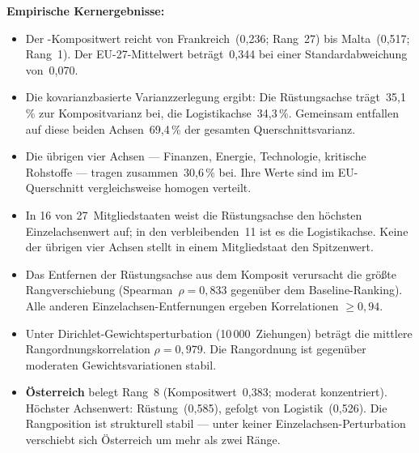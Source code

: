 \medskip
\textbf{Empirische Kernergebnisse:}
\begin{itemize}[leftmargin=2em]
  \item Der \ISI-Kompositwert reicht von Frankreich~(0{,}236;
    Rang~27) bis Malta~(0{,}517; Rang~1).  Der EU-27-Mittelwert
    betr\"agt~0{,}344 bei einer Standardabweichung von~0{,}070.

  \item \begin{sloppypar}Die kovarianz\-basierte Varianz\-zerlegung
    ergibt: Die R\"ustungsachse tr\"agt~35{,}1\,\% zur
    Komposit\-varianz bei, die Logistik\-achse~34{,}3\,\%.
    Gemeinsam entfallen auf diese beiden
    Achsen~69{,}4\,\% der gesamten
    Querschnitts\-varianz.\end{sloppypar}

  \item Die \"ubrigen vier Achsen --- Finanzen, Energie, Technologie,
    kritische Rohstoffe --- tragen zusammen~30{,}6\,\% bei.  Ihre
    Werte sind im EU-Querschnitt vergleichsweise homogen verteilt.

  \item In 16 von 27~Mitgliedstaaten weist die R\"ustungsachse den
    h\"ochsten Einzelachsenwert auf; in den verbleibenden~11 ist es
    die Logistik\-achse.  Keine der \"ubrigen vier Achsen stellt in
    einem Mitgliedstaat den Spitzenwert.

  \item Das Entfernen der R\"ustungsachse aus dem Komposit verursacht
    die gr\"o\ss te Rangverschiebung
    (Spearman~$\rho = 0{,}833$ gegen\"uber dem Baseline-Ranking).
    Alle anderen Einzelachsen-Entfernungen ergeben Korrelationen
    $\geq 0{,}94$.

  \item Unter Dirichlet-Gewichtsperturbation (10\,000~Ziehungen)
    betr\"agt die mittlere Rang\-ordnungs\-korrelation
    $\rho = 0{,}979$.  Die Rangordnung ist gegen\"uber moderaten
    Gewichts\-variationen stabil.

  \item \textbf{\"Osterreich} belegt Rang~8 (Kompositwert~0{,}383;
    moderat konzentriert).  H\"ochster Achsenwert:
    R\"ustung~(0{,}585), gefolgt von Logistik~(0{,}526).  Die
    Rangposition ist strukturell stabil --- unter keiner
    Einzelachsen-Perturbation verschiebt sich \"Osterreich um mehr
    als zwei R\"ange.
\end{itemize}


\newpage
